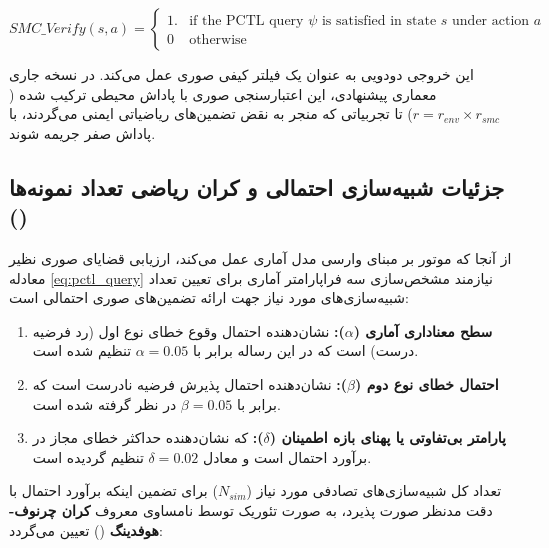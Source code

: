 \documentclass[oneside,openany,phd]{TMU-Thesis}
\begin{document}
\begin{equation}
SMC\_Verify(s, a) = \begin{cases}
1. & \text{if the PCTL query } \psi \text{ is satisfied in state } s \text{ under action } a \\
0 & \text{otherwise}
\end{cases}
\label{eq:smc_verify_function}
\end{equation}



این خروجی دودویی به عنوان یک فیلتر کیفی صوری عمل می‌کند. در نسخه جاری معماری پیشنهادی، این اعتبارسنجی صوری با پاداش محیطی ترکیب شده ($r = r_{env} \times r_{smc}$) تا تجربیاتی که منجر به نقض تضمین‌های ریاضیاتی ایمنی می‌گردند، با پاداش صفر جریمه شوند.



\subsection{جزئیات شبیه‌سازی احتمالی و کران ریاضی تعداد نمونه‌ها ()}

\label{subsec:smc_probabilistic_parameters}

از آنجا که موتور  بر مبنای وارسی مدل آماری عمل می‌کند، ارزیابی قضایای صوری نظیر معادله \ref{eq:pctl_query} نیازمند مشخص‌سازی سه فراپارامتر آماری برای تعیین تعداد شبیه‌سازی‌های مورد نیاز جهت ارائه تضمین‌های صوری احتمالی است:

\begin{enumerate}

\item \textbf{سطح معناداری آماری ($\alpha$):} نشان‌دهنده احتمال وقوع خطای نوع اول (رد فرضیه درست) است که در این رساله برابر با $\alpha = 0.05$ تنظیم شده است.

\item \textbf{احتمال خطای نوع دوم ($\beta$):} نشان‌دهنده احتمال پذیرش فرضیه نادرست است که برابر با $\beta = 0.05$ در نظر گرفته شده است.

\item \textbf{پارامتر بی‌تفاوتی یا پهنای بازه اطمینان ($\delta$):} که نشان‌دهنده حداکثر خطای مجاز در برآورد احتمال است و معادل $\delta = 0.02$ تنظیم گردیده است.

\end{enumerate}



تعداد کل شبیه‌سازی‌های تصادفی مورد نیاز ($N_{sim}$) برای تضمین اینکه برآورد احتمال با دقت مدنظر صورت پذیرد، به صورت تئوریک توسط نامساوی معروف \textbf{کران چرنوف-هوفدینگ} () \cite{hoeffding1963probability} تعیین می‌گردد:
\end{document}
